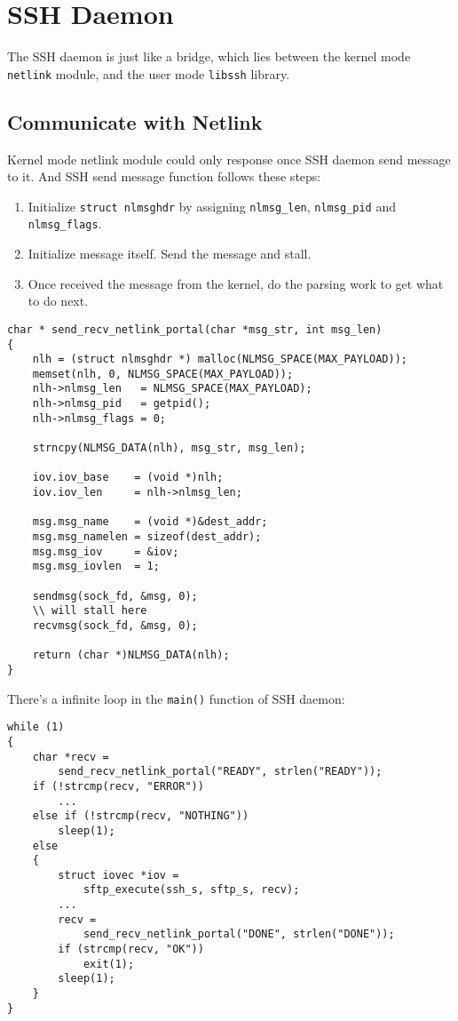 \section{SSH Daemon}

The SSH daemon is just like a bridge, which lies between the kernel mode \lstinline{netlink} module, and the user mode \lstinline{libssh} library. 

\subsection{Communicate with Netlink}
Kernel mode netlink module could only response once SSH daemon send message to it. And SSH send message function follows these steps:
\begin{enumerate}
\item Initialize \lstinline{struct nlmsghdr} by assigning \lstinline{nlmsg_len}, \lstinline{nlmsg_pid} and \lstinline{nlmsg_flags}.
\item Initialize message itself. Send the message and stall.
\item Once received the message from the kernel, do the parsing work to get what to do next.
\end{enumerate}
\newpage
\begin{lstlisting}[title=\bfseries Communicate with Netlink]
char * send_recv_netlink_portal(char *msg_str, int msg_len)
{
    nlh = (struct nlmsghdr *) malloc(NLMSG_SPACE(MAX_PAYLOAD));
    memset(nlh, 0, NLMSG_SPACE(MAX_PAYLOAD));
    nlh->nlmsg_len   = NLMSG_SPACE(MAX_PAYLOAD);
    nlh->nlmsg_pid   = getpid();
    nlh->nlmsg_flags = 0;

    strncpy(NLMSG_DATA(nlh), msg_str, msg_len);

    iov.iov_base    = (void *)nlh;
    iov.iov_len     = nlh->nlmsg_len;

    msg.msg_name    = (void *)&dest_addr;
    msg.msg_namelen = sizeof(dest_addr);
    msg.msg_iov     = &iov;
    msg.msg_iovlen  = 1;

    sendmsg(sock_fd, &msg, 0);
	\\ will stall here
    recvmsg(sock_fd, &msg, 0);

    return (char *)NLMSG_DATA(nlh);
}
\end{lstlisting}

There's a infinite loop in the \lstinline{main()} function of SSH daemon:

\begin{lstlisting}[title=\bfseries Main loop]
while (1)
{
    char *recv =
        send_recv_netlink_portal("READY", strlen("READY"));
    if (!strcmp(recv, "ERROR"))
        ...        
    else if (!strcmp(recv, "NOTHING"))
        sleep(1);
    else
    {
        struct iovec *iov = 
            sftp_execute(ssh_s, sftp_s, recv);
        ...
        recv = 
            send_recv_netlink_portal("DONE", strlen("DONE"));
        if (strcmp(recv, "OK"))
            exit(1);
        sleep(1);
    }
}
\end{lstlisting}

